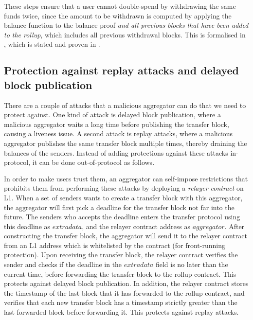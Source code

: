 These steps ensure that a user cannot double-spend by withdrawing the
same funds twice, since the amount to be withdrawn is computed by
applying the balance function to the balance proof \emph{and all
previous blocks that have been added to the rollup}, which includes
all previous withdrawal blocks. This is formalised in
, which is stated and proven in
.

\subsection{Protection against replay attacks and delayed block
publication}\label{section:protection}

There are a couple of attacks that a malicious aggregator can do that
we need to protect against. One kind of attack is delayed block
publication, where a malicious aggregator waits a long time before
publishing the transfer block, causing a liveness issue. A second
attack is replay attacks, where a malicious aggregator publishes the
same transfer block multiple times, thereby draining the balances of
the senders. Instead of adding protections against these attacks
in-protocol, it can be done out-of-protocol as follows.

In order to make users trust them, an aggregator can self-impose
restrictions that prohibits them from performing these attacks by
deploying a \emph{relayer contract} on L1. When a set of senders
wants to create a transfer block with this aggregator, the aggregator
will first pick a deadline for the transfer block not far into the
future. The senders who accepts the deadline enters the transfer
protocol using this deadline as \(extradata\), and the relayer
contract address as \(aggregator\). After constructing the transfer
block, the aggregator will send it to the relayer contract from an L1
address which is whitelisted by the contract (for front-running
protection). Upon receiving the transfer block, the relayer contract
verifies the sender and checks if the deadline in the \(extradata\)
field is no later than the current time, before forwarding the
transfer block to the rollup contract. This protects against delayed
block publication. In addition, the relayer contract stores the
timestamp of the last block that it has forwarded to the rollup
contract, and verifies that each new transfer block has a timestamp
strictly greater than the last forwarded block before forwarding it.
This protects against replay attacks.

